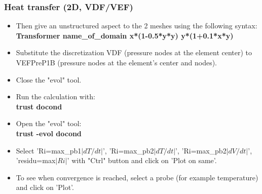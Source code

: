 \documentclass[10pt, hyperref={unicode=true,pdfusetitle, bookmarks=true,bookmarksnumbered=false,bookmarksopen=false, breaklinks=false,pdfborder={0 0l 1},backref=true,colorlinks=true,linkcolor=darkblue,pageanchor}]{beamer}
\begin{document}
\begin{frame}
\frametitle{Heat transfer (2D, VDF/VEF)}
\begin{block}{}

\begin{itemize}
\item Then give an unstructured aspect to the 2 meshes using the following syntax: \\
\textbf{Transformer name\_of\_domain \; x*(1-0.5*y*y) \; y*(1+0.1*x*y)}

\item Substitute the discretization VDF (pressure nodes at the element center) to VEFPreP1B (pressure nodes at the element's center and nodes).

\item Close the "evol" tool.


\item Run the calculation with:\\
\textbf{trust docond }

\item Open the "evol" tool:\\
\textbf{trust -evol docond }

\item Select 'Ri=max\_pb1$|dT/dt|$', 'Ri=max\_pb2$|dT/dt|$', 'Ri=max\_pb2$|dV/dt|$', 'residu=max$|Ri|$' with "Ctrl" button and click on 'Plot on same'.

\item To see when convergence is reached, select a probe (for example temperature) and click on 'Plot'. 

\end{itemize}

\end{block}
\end{frame}
\end{document}
